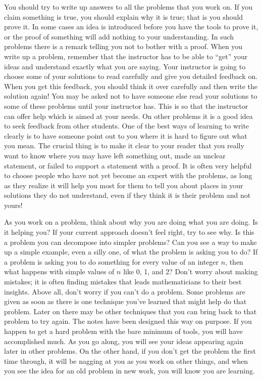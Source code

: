 \documentclass[10pt,]{book}
\theoremstyle{plain}
\theoremstyle{definition}
\numberwithin{equation}{chapter}
\begin{document}
\par
You should try to write up answers to all the problems that you work on. If you claim something is true, you should explain why it is true; that is you should prove it. In some cases an idea is introduced before you have the tools to prove it, or the proof of something will add nothing to your understanding. In such problems there is a remark telling you not to bother with a proof. When you write up a problem, remember that the instructor has to be able to ``get'' your ideas and understand exactly what you are saying. Your instructor is going to choose some of your solutions to read carefully and give you detailed feedback on. When you get this feedback, you should think it over carefully and then write the solution again! You may be asked not to have someone else read your solutions to some of these problems until your instructor has. This is so that the instructor can offer help which is aimed at your needs. On other problems it is a good idea to seek feedback from other students. One of the best ways of learning to write clearly is to have someone point out to you where it is hard to figure out what you mean. The crucial thing is to make it clear to your reader that you really want to know where you may have left something out, made an unclear statement, or failed to support a statement with a proof. It is often very helpful to choose people who have not yet become an expert with the problems, as long as they realize it will help you most for them to tell you about places in your solutions they do not understand, even if they think it is their problem and not yours!%
\par
As you work on a problem, think about why you are doing what you are doing. Is it helping you? If your current approach doesn't feel right, try to see why. Is this a problem you can decompose into simpler problems? Can you see a way to make up a simple example, even a silly one, of what the problem is asking you to do? If a problem is asking you to do something for every value of an integer \(n\), then what happens with simple values of \(n\) like 0, 1, and 2? Don't worry about making mistakes; it is often finding mistakes that leads mathematicians to their best insights. Above all, don't worry if you can't do a problem. Some problems are given as soon as there is one technique you've learned that might help do that problem. Later on there may be other techniques that you can bring back to that problem to try again. The notes have been designed this way on purpose. If you happen to get a hard problem with the bare minimum of tools, you will have accomplished much. As you go along, you will see your ideas appearing again later in other problems. On the other hand, if you don't get the problem the first time through, it will be nagging at you as you work on other things, and when you see the idea for an old problem in new work, you will know you are learning.%
\end{document}

